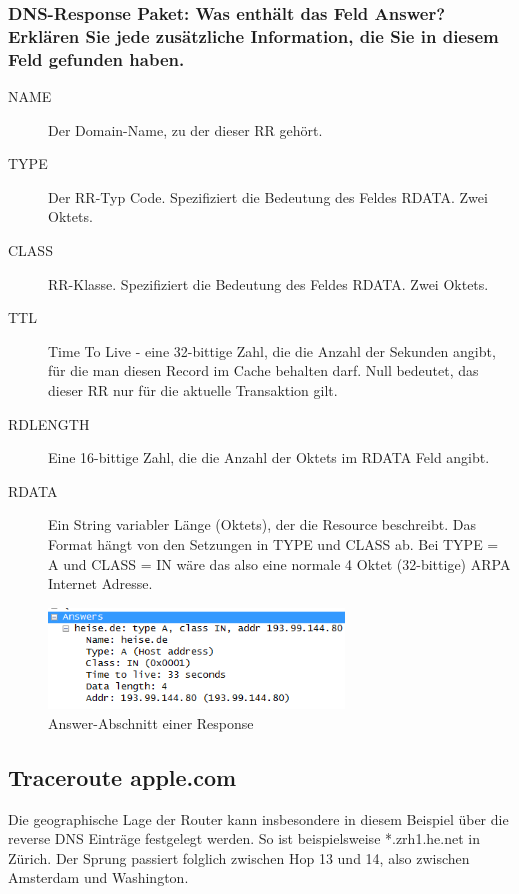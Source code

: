\documentclass[11pt,a4paper]{scrartcl}
\begin{document}
\subsubsection{DNS-Response Paket: Was enthält das Feld Answer? Erklären Sie jede zusätzliche
Information, die Sie in diesem Feld gefunden haben.}
\begin{description}
	\item[NAME] Der Domain-Name, zu der dieser RR gehört. 
	\item[TYPE] Der RR-Typ Code. Spezifiziert die Bedeutung des Feldes RDATA. Zwei Oktets. 
	\item[CLASS] RR-Klasse. Spezifiziert die Bedeutung des Feldes RDATA. Zwei Oktets. 
	\item[TTL] Time To Live - eine 32-bittige Zahl, die die Anzahl der Sekunden angibt, für die man diesen Record im Cache behalten darf. Null bedeutet, das dieser RR nur für die aktuelle Transaktion gilt. 
	\item[RDLENGTH] Eine 16-bittige Zahl, die die Anzahl der Oktets im RDATA Feld angibt. 
	\item[RDATA] Ein String variabler Länge (Oktets), der die Resource beschreibt. Das Format hängt von den Setzungen in TYPE und CLASS ab. Bei TYPE = A und CLASS = IN wäre das also eine normale 4 Oktet (32-bittige) ARPA Internet Adresse.
\end{description}
\begin{figure}[h]
	\centering
	\includegraphics[width=0.7\textwidth]{../aufg2/dns_2_2_4.png}
	\caption{Answer-Abschnitt einer Response}
	\label{fig:dns_2_2_4}
\end{figure}

\subsection{Traceroute apple.com}
Die geographische Lage der Router kann insbesondere in diesem Beispiel über die reverse DNS Einträge festgelegt werden. So ist beispielsweise *.zrh1.he.net in Zürich. Der Sprung passiert folglich zwischen Hop 13 und 14, also zwischen Amsterdam und Washington.
\end{document}
